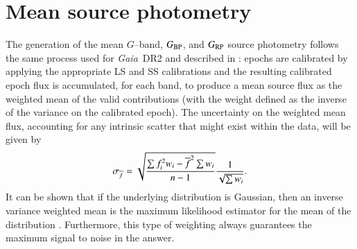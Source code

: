 \documentclass{aa}
\newcommand{\gaia}{\textit{Gaia}\xspace}
\newcommand{\gband}{$G$--band\xspace}
\newcommand{\gbp}{\ensuremath{G_{\rm BP}}\xspace}
\newcommand{\grp}{\ensuremath{G_{\rm RP}}\xspace}
\newcommand{\drt}{\gaia~DR2\xspace}
\begin{document}
\section{Mean source photometry}\label{sec:sourcephot}

The generation of the mean \gband, \gbp, and \grp source photometry follows the same process used for \drt and described in \cite{Proc_DR2}: epochs are calibrated by applying the appropriate LS and SS calibrations and the resulting calibrated epoch flux is accumulated, for each band, to produce a mean source flux as the weighted mean of the valid contributions (with the weight defined as the inverse of the variance on the calibrated epoch). 
The uncertainty on the weighted mean flux, accounting for any intrinsic scatter that might exist within the data, will be given by
%
\begin{equation}
   \sigma_{\overline{f}}=
       \sqrt{\sum f_i^2w_i - \overline{f}^2\sum w_i \over {n-1}}
       {1 \over \sqrt{\sum w_i}}.
\end{equation}
%
It can be shown that if the underlying distribution is Gaussian, then an inverse variance weighted mean is the maximum likelihood estimator for the mean of the distribution \citep{lupton1993statistics}. 
Furthermore, this type of weighting always guarantees the maximum signal to noise in the answer.
\end{document}
